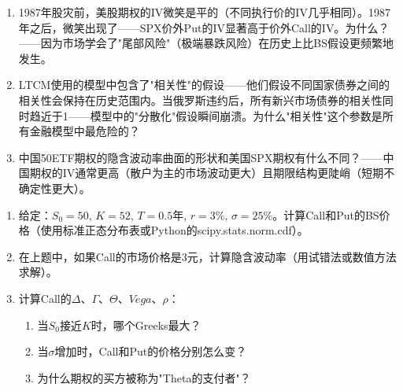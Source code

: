 \documentclass[a4paper,11pt]{ctexbook}
\begin{document}
\begin{discuss}
\begin{enumerate}
  \item 1987年股灾前，美股期权的IV微笑是平的（不同执行价的IV几乎相同）。1987年之后，微笑出现了——SPX价外Put的IV显著高于价外Call的IV。为什么？——因为市场学会了"尾部风险"（极端暴跌风险）在历史上比BS假设更频繁地发生。
  \item LTCM使用的模型中包含了"相关性"的假设——他们假设不同国家债券之间的相关性会保持在历史范围内。当俄罗斯违约后，所有新兴市场债券的相关性同时趋近于1——模型中的"分散化"假设瞬间崩溃。为什么"相关性"这个参数是所有金融模型中最危险的？
  \item 中国50ETF期权的隐含波动率曲面的形状和美国SPX期权有什么不同？——中国期权的IV通常更高（散户为主的市场波动更大）且期限结构更陡峭（短期不确定性更大）。
\end{enumerate}
\end{discuss}

\begin{exercises}
\begin{enumerate}
  \item 给定：$S_0=50$, $K=52$, $T=0.5$年, $r=3\%$, $\sigma=25\%$。计算Call和Put的BS价格（使用标准正态分布表或Python的scipy.stats.norm.cdf）。
  \item 在上题中，如果Call的市场价格是3元，计算隐含波动率（用试错法或数值方法求解）。
  \item 计算Call的$\Delta$、$\Gamma$、$\Theta$、$Vega$、$\rho$：
  \begin{enumerate}
    \item 当$S_0$接近$K$时，哪个Greeks最大？
    \item 当$\sigma$增加时，Call和Put的价格分别怎么变？
    \item 为什么期权的买方被称为"Theta的支付者"？
  \end{enumerate}
\end{enumerate}
\end{exercises}

\end{document}
